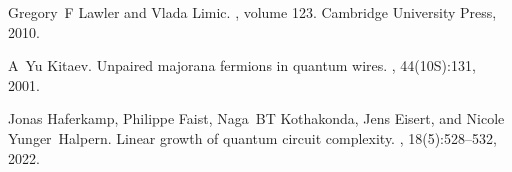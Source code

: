 \documentclass[showpacs,twocolumn,aps,prx,long bibliography,superscriptaddress,notitlepage]{revtex4-1}
\begin{document}
\begin{thebibliography}{10}
Gregory~F Lawler and Vlada Limic.
, volume 123.
\newblock Cambridge University Press, 2010.

A~Yu Kitaev.
\newblock Unpaired majorana fermions in quantum wires.
, 44(10S):131, 2001.

Jonas Haferkamp, Philippe Faist, Naga~BT Kothakonda, Jens Eisert, and Nicole
  Yunger~Halpern.
\newblock Linear growth of quantum circuit complexity.
, 18(5):528--532, 2022.

\end{thebibliography}
\end{document}
